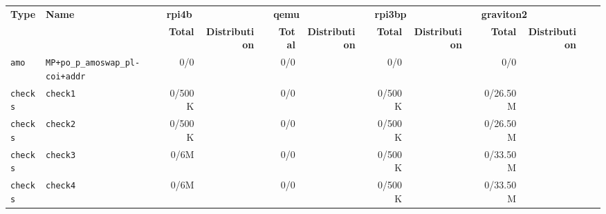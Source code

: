 \begin{tabular}{l l  | r r l | r r l | r r l | r r l l}
   \textbf{Type}    & \textbf{Name}                                              & \multicolumn{3}{l}{\textbf{rpi4b}}                         & \multicolumn{3}{l}{\textbf{qemu}}                       & \multicolumn{3}{l}{\textbf{rpi3bp}}                         & \multicolumn{3}{l}{\textbf{graviton2}}                         & \\
                    &                                                            & \textbf{Total} & \textbf{Distribution} &                   & \textbf{Total} & \textbf{Distribution} &                 & \textbf{Total} & \textbf{Distribution} &                   & \textbf{Total} & \textbf{Distribution} &                   & \\
         \verb|amo| &                         \verb|MP+po_p_amoswap_pl-coi+addr| &            0/0 &                       &                   &            0/0 &                       &                 &            0/0 &                       &                   &            0/0 &                       &                   & \\ \hline 
      \verb|checks| &                                              \verb|check1| &         0/500K &                       &                   &            0/0 &                       &                 &         0/500K &                       &                   &       0/26.50M &                       &                   & \\ \hline 
      \verb|checks| &                                              \verb|check2| &         0/500K &                       &                   &            0/0 &                       &                 &         0/500K &                       &                   &       0/26.50M &                       &                   & \\ \hline 
      \verb|checks| &                                              \verb|check3| &           0/6M &                       &                   &            0/0 &                       &                 &         0/500K &                       &                   &       0/33.50M &                       &                   & \\ \hline 
      \verb|checks| &                                              \verb|check4| &           0/6M &                       &                   &            0/0 &                       &                 &         0/500K &                       &                   &       0/33.50M &                       &                   & \\ \hline 

\end{tabular}
